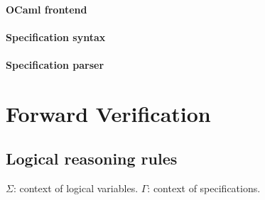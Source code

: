 \paragraph{OCaml frontend}

\paragraph{Specification syntax}

\paragraph{Specification parser}



\section{Forward Verification}


\subsection{Logical reasoning rules}

$\Sigma$: context of logical variables. $\Gamma$: context of specifications.


